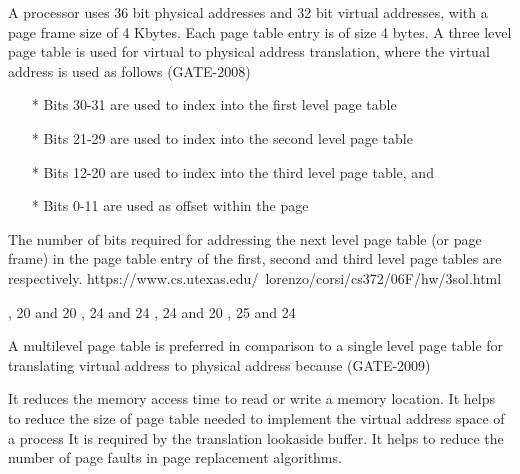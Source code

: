 \begin{questyle}

  \question  A processor uses 36 bit physical addresses and 32 bit virtual addresses, with a page frame size
             of 4 Kbytes. Each page table entry is of size 4 bytes. A three level page table is used for virtual to
             physical address translation, where the virtual address is used as follows (GATE-2008)
            \begin{enumerate}
                \item[*] Bits 30-31 are used to index into the first level page table
                \item[*] Bits 21-29 are used to index into the second level page table
                \item[*] Bits 12-20 are used to index into the third level page table, and
                \item[*] Bits 0-11 are used as offset within the page
            \end{enumerate}
            The number of bits required for addressing the next level page table (or page frame) in the page table entry of the first, second and third level page tables are respectively. https://www.cs.utexas.edu/~lorenzo/corsi/cs372/06F/hw/3sol.html

  \begin{choices}
    , 20 and 20
    , 24 and 24
    , 24 and 20
    , 25 and 24
  \end{choices}

\end{questyle}


\begin{questyle}

  \question  A multilevel page table is preferred in comparison to a single level page table for translating virtual
             address to physical address because (GATE-2009)

  \begin{choices}
    \choice It reduces the memory access time to read or write a memory location.
    \correctchoice It helps to reduce the size of page table needed to implement the virtual address space of a process
    \choice It is required by the translation lookaside buffer.
    \choice It helps to reduce the number of page faults in page replacement algorithms.
  \end{choices}

\end{questyle}

